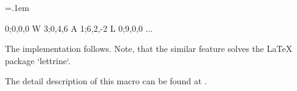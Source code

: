 \begtt
\newdimen\ptem     \ptem=.1em        %
\newdimen\Capsize  {}\ptem  %
\newdimen\Capabove {}\ptem  %
\newdimen\Capafter {}\ptem  %
\def\Capprefix{\localcolor\Red}      %
 
 {0;0,0,0}  %
\declCap W {3;0,4,6} 
\declCap A {1;6,2,-2} 
\declCap L {0;9,0,0} 
... 
\endtt


The implementation follows. Note, that the similar feature solves the LaTeX package `lettrine`. 

\begtt
\def\declCap #1#2{\sxdef{cap:=#1}{#2}} 
\def\Capinsert{\def\leftCapmaterial{}\futurelet\next\CapinsertA} 
\def\CapinsertA{\ifx\next\bgroup \expandafter\CapinsertB \else 
\expandafter\CapinsertC \fi} 
\def\CapinsertB #1{\def\leftCapmaterial{#1}\CapinsertC} 
\def\CapinsertC #1{\par 
  \isdefined{cap:=#1}\iftrue \edef\tmp{\csname cap:=#1\endcsname}%
                     \else   \edef\tmp{\csname cap:=default\endcsname}\fi 
  \setbox0=\hbox{{\thefontsize[\expandafter\ignorept\the\Capsize]\Capprefix#1}\kern\Capafter}%
  \expandafter \CapinsertD \tmp,,%
  \noindent\kern-\firstlineindent \rlap{\kern-\protrudeCap\ptem\llap{\leftCapmaterial}%
                                        \vbox to0pt{\kern-\Capabove\box0\vss}}%
  \kern\firstlineindent 
} 
\def\CapinsertD #1;{\tmpnum=1 \let\firstlineindent=\undefined 
   \def\parshapeparams{}\def\protrudeCap{#1}\CapinsertE} 
\def\CapinsertE #1,{\ifx,#1,\parshape =\tmpnum \parshapeparams 0pt \hsize 
  \else 
     \advance\tmpnum by1 
     \tmpdim=\wd0 \advance\tmpdim by-#1\ptem \advance\tmpdim by-\protrudeCap\ptem 
     \edef\parshapeparams{\parshapeparams\the\tmpdim}%
     \ifx\firstlineindent\undefined \let\firstlineindent\parshapeparams \fi 
     \advance\tmpdim by-\hsize \tmpdim=-\tmpdim 
     \edef\parshapeparams{\parshapeparams\the\tmpdim}%
     \expandafter \CapinsertE \fi 
} 
\endtt


The detail description of this macro can be found at . 


 


